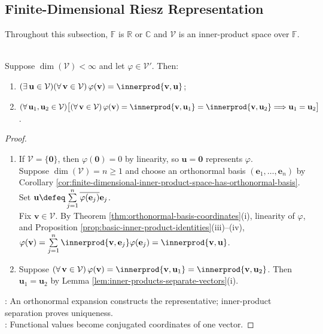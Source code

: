 \subsection{Finite-Dimensional Riesz Representation}

Throughout this subsection, $\mathbb{F}$ is $\mathbb{R}$ or $\mathbb{C}$ and $\mathcal{V}$ is an inner-product space over $\mathbb{F}$.

\begin{theorem} \label{thm:riesz-representation-finite-dimensional} \\
Suppose $\dim(\mathcal{V})<\infty$ and let $\varphi\in\mathcal{V}'$. Then:
\begin{enumerate}[label=(\roman*)]
\setlength{\itemsep}{0pt}
\item $(\exists\,\mathbf{u}\in\mathcal{V})(\forall\,\mathbf{v}\in\mathcal{V})\,\varphi(\mathbf{v})=\innerprod{\mathbf{v},\mathbf{u}}$;
\item $(\forall\,\mathbf{u}_1,\mathbf{u}_2\in\mathcal{V})\bigl[(\forall\,\mathbf{v}\in\mathcal{V})\,\varphi(\mathbf{v})=\innerprod{\mathbf{v},\mathbf{u}_1}=\innerprod{\mathbf{v},\mathbf{u}_2}\Longrightarrow\mathbf{u}_1=\mathbf{u}_2\bigr]$.
\end{enumerate}
\begin{proof}
\begin{enumerate}[label=(\roman*)]
\setlength{\itemsep}{0pt}
\item If $\mathcal{V}=\{\mathbf{0}\}$, then $\varphi(\mathbf{0})=0$ by linearity, so $\mathbf{u}=\mathbf{0}$ represents $\varphi$.\\
Suppose $\dim(\mathcal{V})=n\geq1$ and choose an orthonormal basis $(\mathbf{e}_1,\ldots,\mathbf{e}_n)$ by Corollary \ref{cor:finite-dimensional-inner-product-space-has-orthonormal-basis}. Set $\mathbf{u}\defeq\sum\limits_{j=1}^{n}\overline{\varphi(\mathbf{e}_j)}\mathbf{e}_j$.\\
Fix $\mathbf{v}\in\mathcal{V}$. By Theorem \ref{thm:orthonormal-basis-coordinates}(i), linearity of $\varphi$, and Proposition \ref{prop:basic-inner-product-identities}(iii)--(iv), $\varphi(\mathbf{v})=\sum\limits_{j=1}^{n}\innerprod{\mathbf{v},\mathbf{e}_j}\varphi(\mathbf{e}_j)=\innerprod{\mathbf{v},\mathbf{u}}$.
\item Suppose $(\forall\,\mathbf{v}\in\mathcal{V})\,\varphi(\mathbf{v})=\innerprod{\mathbf{v},\mathbf{u}_1}=\innerprod{\mathbf{v},\mathbf{u}_2}$. Then $\mathbf{u}_1=\mathbf{u}_2$ by Lemma \ref{lem:inner-products-separate-vectors}(i).
\end{enumerate}
: An orthonormal expansion constructs the representative; inner-product separation proves uniqueness.\\
: Functional values become conjugated coordinates of one vector.
\end{proof}
\end{theorem}

